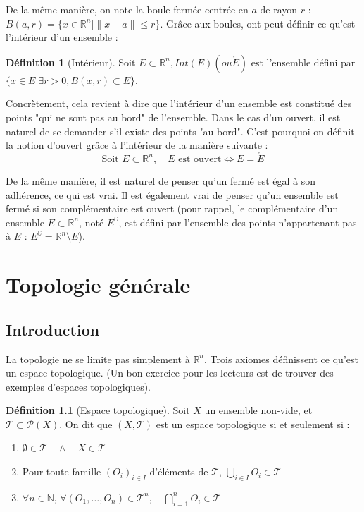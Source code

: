 \documentclass[12pt, a4paper]{report}
\theoremstyle{definition}
\newtheorem{definition}{Définition}[chapter]
\begin{document}
De la même manière, on note la boule fermée centrée en $a$ de rayon $r$ : $\overline{B(a, r)} = \{ x \in \mathbb{R}^{n} \mid \|x - a\| \le r \}$.
Grâce aux boules, ont peut définir ce qu'est l'intérieur d'un ensemble :
\begin{definition}[Intérieur]
Soit $E \subset \mathbb{R}^{n}, Int(E) (ou \mathring{E})$ est l'ensemble défini par $\{ x \in E | \exists r > 0, B(x, r) \subset E \}$.
\end{definition}
Concrètement, cela revient à dire que l'intérieur d'un ensemble est constitué des points "qui ne sont pas au bord" de l'ensemble. Dans le cas d'un ouvert, il est naturel de se demander s'il existe des points "au bord". C'est pourquoi on définit la notion d'ouvert grâce à l'intérieur de la manière suivante : 
\[ \text{Soit } E \subset \mathbb{R}^{n}, \quad E \text{ est ouvert} \iff E = \mathring{E} \]

De la même manière, il est naturel de penser qu'un fermé est égal à son adhérence, ce qui est vrai. Il est également vrai de penser qu'un ensemble est fermé si son complémentaire est ouvert (pour rappel, le complémentaire d'un ensemble $E \subset \mathbb{R}^{n}$, noté $E^{\complement}$, est défini par l'ensemble des points n'appartenant pas à $E$ : $E^{\complement} = \mathbb{R}^{n} \setminus E$).

\chapter{Topologie générale}
\section{Introduction}
La topologie ne se limite pas simplement à $\mathbb{R}^{n}$. Trois axiomes définissent ce qu'est un espace topologique. (Un bon exercice pour les lecteurs est de trouver des exemples d'espaces topologiques).

\begin{definition}[Espace topologique]
Soit $X$ un ensemble non-vide, et $\mathcal{T} \subset \mathcal{P}(X)$. On dit que $(X, \mathcal{T})$ est un espace topologique si et seulement si :
\begin{enumerate}
	\item $\emptyset \in \mathcal{T} \quad \land \quad X \in \mathcal{T}$
	\item Pour toute famille $(O_i)_{i \in I}$ d'éléments de $\mathcal{T}$, $\bigcup_{i \in I} O_i \in \mathcal{T}$
	\item $\forall n \in \mathbb{N}, \, \forall (O_1, \dots, O_n) \in \mathcal{T}^{n}, \quad \bigcap_{i = 1}^{n} O_i \in \mathcal{T}$
\end{enumerate}
\end{definition}
\end{document}
